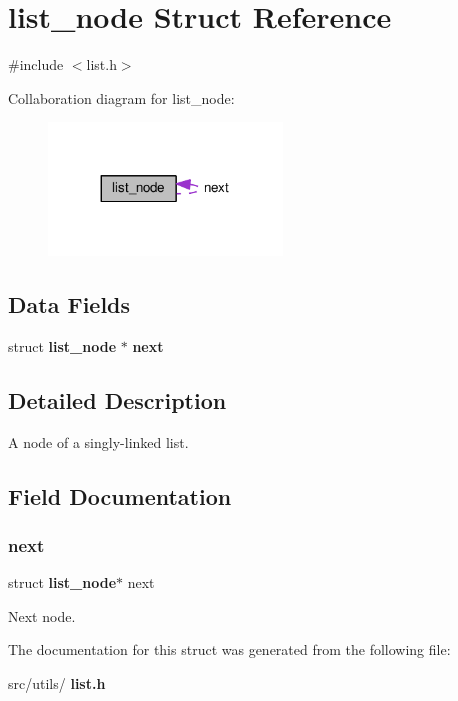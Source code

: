 \section{list\+\_\+node Struct Reference}
\label{structlist__node}


{\ttfamily \#include $<$list.\+h$>$}



Collaboration diagram for list\+\_\+node\+:\nopagebreak
\begin{figure}[H]
\begin{center}
\leavevmode
\includegraphics[width=176pt]{structlist__node__coll__graph}
\end{center}
\end{figure}
\subsection*{Data Fields}
\begin{DoxyCompactItemize}
\item 
struct \textbf{ list\+\_\+node} $\ast$ \textbf{ next}
\end{DoxyCompactItemize}


\subsection{Detailed Description}
A node of a singly-\/linked list. 

\subsection{Field Documentation}
\mbox{\label{structlist__node_a233bfe7cf29d581dfb42116900d0739f}} 
\subsubsection{next}
{\footnotesize\ttfamily struct \textbf{ list\+\_\+node}$\ast$ next}

Next node. 

The documentation for this struct was generated from the following file\+:\begin{DoxyCompactItemize}
\item 
src/utils/\textbf{ list.\+h}\end{DoxyCompactItemize}
